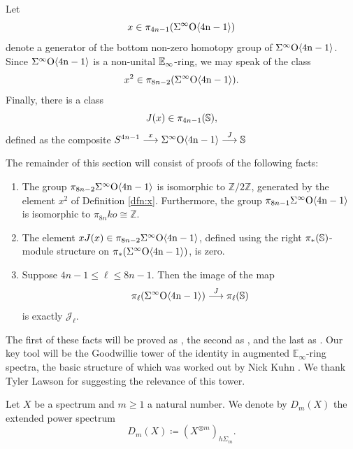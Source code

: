 \begin{dfn} \label{dfn:x}
Let $$x \in \pi_{4n-1}(\Sigma^{\infty} \mathrm{O \langle 4n-1\rangle})$$
denote a generator of the bottom non-zero homotopy group of $\Sigma^{\infty} \mathrm{O \langle 4n-1\rangle}$.  Since $\Sigma^{\infty} \mathrm{O \langle 4n-1\rangle}$ is a non-unital $\operatorname{\mathbb{E}}_\infty$-ring, we may speak of the class
$$x^2 \in \pi_{8n-2}(\Sigma^{\infty} \mathrm{O \langle 4n-1\rangle}).$$
Finally, there is a class
$$J(x) \in \pi_{4n-1}(\operatorname{\mathbb{S}}),$$
defined as the composite
$S^{4n-1} \stackrel{x}{\longrightarrow} \Sigma^{\infty} \mathrm{O \langle 4n-1\rangle} \stackrel{J}{\longrightarrow} \operatorname{\mathbb{S}}$
\end{dfn}
The remainder of this section will consist of proofs of the following facts:
\begin{enumerate}
\item The group $\pi_{8n-2}\Sigma^{\infty} \mathrm{O \langle 4n-1\rangle}$ is isomorphic to $\mathbb{Z}/2\mathbb{Z}$, generated by the element $x^2$ of Definition \ref{dfn:x}.
    Furthermore, the group $\pi_{8n-1} \Sigma^{\infty} \mathrm{O \langle 4n-1\rangle}$ is isomorphic to $\pi_{8n} ko \cong \mathbb{Z}$.
\item The element $xJ(x) \in \pi_{8n-2} \Sigma^{\infty} \mathrm{O \langle 4n-1\rangle}$, defined using the right $\pi_*(\operatorname{\mathbb{S}})$-module structure on $\pi_*(\Sigma^{\infty} \mathrm{O \langle 4n-1\rangle})$, is zero.
\item
Suppose $4n-1 \le \ell \le 8n-1$.  Then the image of the map
$$\pi_{\ell}(\Sigma^{\infty} \mathrm{O \langle 4n-1\rangle}) \stackrel{J}{\longrightarrow} \pi_{\ell}(\mathbb{S})$$
is exactly $\mathcal{J}_{\ell}$.
\end{enumerate}

The first of these facts will be proved as , the second as , and the last as .
Our key tool will be the Goodwillie tower of the identity in augmented $\mathbb{E}_\infty$-ring spectra, the basic structure of which was worked out by Nick Kuhn \cite{KuhnTAQ}.
We thank Tyler Lawson for suggesting the relevance of this tower.

\begin{dfn}
Let $X$ be a spectrum and $m \ge 1$ a natural number.  We denote by $D_m(X)$ the extended power spectrum
$$D_m(X) \coloneqq (X^{\otimes m})_{h\Sigma_m}.$$
\end{dfn}

